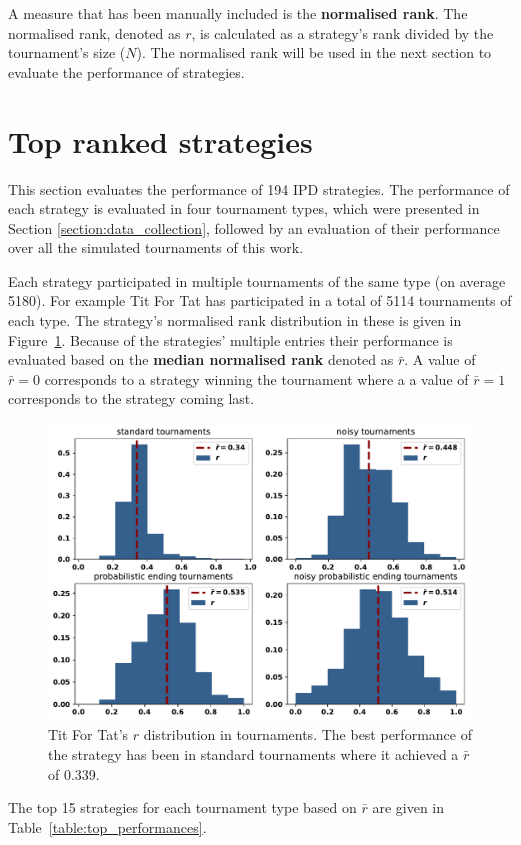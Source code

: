 \documentclass{article}
\newcommand{\numberofalltournaments}{}
\begin{document}
A measure that has been manually included
is the \textbf{normalised rank}. The normalised rank, denoted as $r$, is
calculated as a strategy's rank divided by the tournament's size ($N$). The
normalised rank will be used in the next section to evaluate the performance of
strategies.

\section{Top ranked strategies}\label{section:top_performances}

This section evaluates the performance of 194 IPD strategies. The performance of
each strategy is evaluated in four tournament types, which were presented in Section
\ref{section:data_collection}, followed by an evaluation of their performance
over all the \numberofalltournaments simulated tournaments of this work.

Each strategy participated in multiple tournaments of the same type (on average 5180).
For example Tit For Tat has participated in a total of 5114
tournaments of each type. The strategy's normalised rank distribution in these
is given in Figure~\ref{fig:tit_for_tat_r_distribution}. Because of the strategies'
multiple entries their performance is evaluated based on the
\textbf{median normalised rank} denoted as \(\bar{r}\). A value of \(\bar{r} =
0\) corresponds to a strategy winning the tournament where a a value of
\(\bar{r} = 1\) corresponds to the strategy coming last.

\begin{figure}[!htbp]
    \centering
    \includegraphics[width=.45\textwidth]{../images/tit_for_tat_r_distributions.pdf}
    \caption{Tit For Tat's $r$ distribution in tournaments. The best performance
    of the strategy has been in standard tournaments where it achieved a $\bar{r}$
    of 0.339.}
    \label{fig:tit_for_tat_r_distribution}
\end{figure}

The top 15 strategies for each tournament type based on \(\bar{r}\) are given in
Table~\ref{table:top_performances}.
\end{document}
